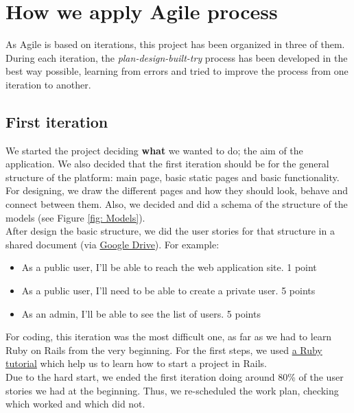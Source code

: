 
\section{How we apply Agile process}
\vspace{-5mm}
As Agile is based on iterations, this project has been organized in three of them. During each iteration, the \textit{plan-design-built-try} process has been developed in the best way possible, learning from errors and tried to improve the process from one iteration to another.
	\subsection{First iteration}
	\vspace{-5mm}
	We started the project deciding \textbf{what} we wanted to do; the aim of the application. We also decided that the first iteration should be for the general structure of the platform: main page, basic static pages and basic functionality. For designing, we draw the different pages and how they should look, behave and connect between them. Also, we decided and did a schema of the structure of the models (see Figure \ref{fig: Models}).\\
	After design the basic structure, we did the user stories for that structure in a shared document (via \href{https://drive.google.com/drive/my-drive/}{Google Drive}). For example:
	\begin{itemize} \setlength{\itemsep}{-5pt}
	\item As a public user, I’ll be able to reach the web application site. 1 point
	\item As a public user, I’ll need to be able to create a private user. 5 points
	\item As an admin, I’ll be able to see the list of users. 5 points
	\end{itemize}
	For coding, this iteration was the most difficult one, as far as we had to learn Ruby on Rails from the very beginning. For the first steps, we used \href{https://www.railstutorial.org/book/}{a Ruby tutorial} which help us to learn how to start a project in Rails.\\
	Due to the hard start, we ended the first iteration doing around 80\% of the user stories we had at the beginning. Thus, we re-scheduled the work plan, checking which worked and which did not.
